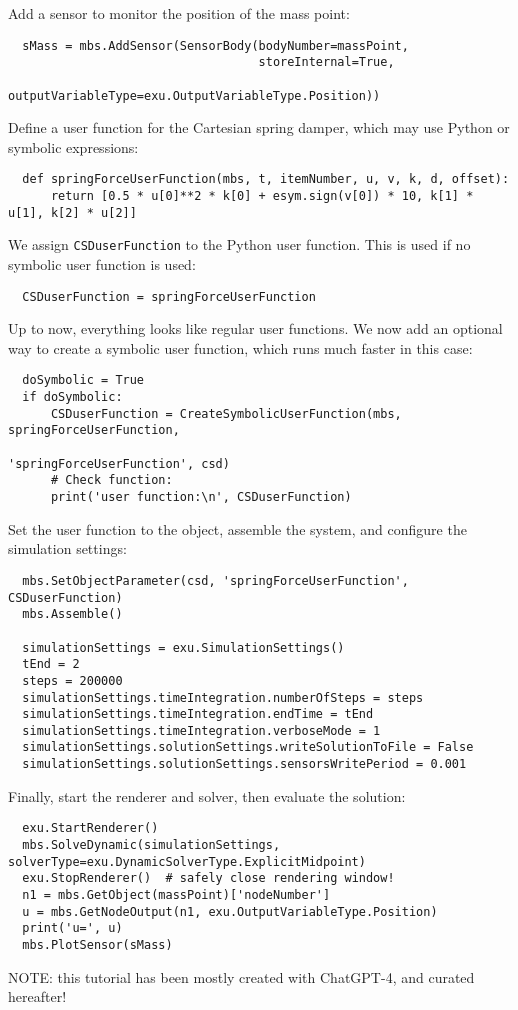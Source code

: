 %
Add a sensor to monitor the position of the mass point:
\pythonstyle\begin{lstlisting}
  sMass = mbs.AddSensor(SensorBody(bodyNumber=massPoint,
                                   storeInternal=True,
                                   outputVariableType=exu.OutputVariableType.Position))
\end{lstlisting}
%
Define a user function for the Cartesian spring damper, which may use Python or symbolic expressions:
\pythonstyle\begin{lstlisting}
  def springForceUserFunction(mbs, t, itemNumber, u, v, k, d, offset):
      return [0.5 * u[0]**2 * k[0] + esym.sign(v[0]) * 10, k[1] * u[1], k[2] * u[2]]
\end{lstlisting}
%
We assign \texttt{CSDuserFunction} to the Python user function. This is used if no symbolic user function is used:
\pythonstyle\begin{lstlisting}
  CSDuserFunction = springForceUserFunction
\end{lstlisting}
%
Up to now, everything looks like regular user functions. We now add an optional way to create a symbolic user function, which runs much faster in this case:
\pythonstyle\begin{lstlisting}
  doSymbolic = True
  if doSymbolic:
      CSDuserFunction = CreateSymbolicUserFunction(mbs, springForceUserFunction,
                                                   'springForceUserFunction', csd)
      # Check function:
      print('user function:\n', CSDuserFunction)
\end{lstlisting}
%
Set the user function to the object, assemble the system, and configure the simulation settings:
\pythonstyle\begin{lstlisting}
  mbs.SetObjectParameter(csd, 'springForceUserFunction', CSDuserFunction)
  mbs.Assemble()

  simulationSettings = exu.SimulationSettings()
  tEnd = 2
  steps = 200000
  simulationSettings.timeIntegration.numberOfSteps = steps
  simulationSettings.timeIntegration.endTime = tEnd
  simulationSettings.timeIntegration.verboseMode = 1
  simulationSettings.solutionSettings.writeSolutionToFile = False
  simulationSettings.solutionSettings.sensorsWritePeriod = 0.001
\end{lstlisting}
%
Finally, start the renderer and solver, then evaluate the solution:
\pythonstyle\begin{lstlisting}
  exu.StartRenderer()
  mbs.SolveDynamic(simulationSettings, solverType=exu.DynamicSolverType.ExplicitMidpoint)
  exu.StopRenderer()  # safely close rendering window!
  n1 = mbs.GetObject(massPoint)['nodeNumber']
  u = mbs.GetNodeOutput(n1, exu.OutputVariableType.Position)
  print('u=', u)
  mbs.PlotSensor(sMass)
\end{lstlisting}
%
NOTE: this tutorial has been mostly created with ChatGPT-4, and curated hereafter!


